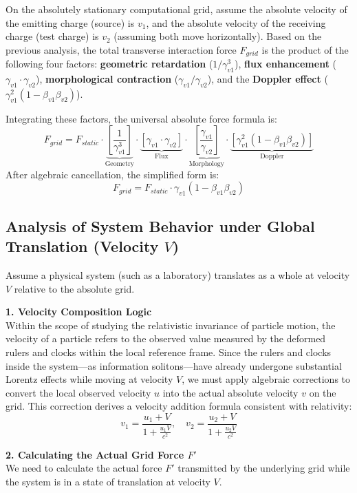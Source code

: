 \documentclass[12pt, a4paper]{article}
\begin{document}
On the absolutely stationary computational grid, assume the absolute velocity of the emitting charge (source) is $v_1$, and the absolute velocity of the receiving charge (test charge) is $v_2$ (assuming both move horizontally). Based on the previous analysis, the total transverse interaction force $F_{grid}$ is the product of the following four factors: \textbf{geometric retardation} ($1/\gamma_{v1}^3$), \textbf{flux enhancement} ($\gamma_{v1} \cdot \gamma_{v2}$), \textbf{morphological contraction} ($\gamma_{v1} / \gamma_{v2}$), and the \textbf{Doppler effect} ($\gamma_{v1}^2 (1 - \beta_{v1}\beta_{v2})$).

Integrating these factors, the universal absolute force formula is:
\[
F_{grid} = F_{static} \cdot \underbrace{\left[ \frac{1}{\gamma_{v1}^3} \right]}_{\text{Geometry}} \cdot \underbrace{\left[ \gamma_{v1} \cdot \gamma_{v2} \right]}_{\text{Flux}} \cdot \underbrace{\left[ \frac{\gamma_{v1}}{\gamma_{v2}} \right]}_{\text{Morphology}} \cdot \underbrace{\left[ \gamma_{v1}^2 (1 - \beta_{v1}\beta_{v2}) \right]}_{\text{Doppler}}
\]
After algebraic cancellation, the simplified form is:
\[
F_{grid} = F_{static} \cdot \gamma_{v1} (1 - \beta_{v1}\beta_{v2})
\]

\subsection{Analysis of System Behavior under Global Translation (Velocity $V$)}

Assume a physical system (such as a laboratory) translates as a whole at velocity $V$ relative to the absolute grid.

\textbf{1. Velocity Composition Logic} \\
Within the scope of studying the relativistic invariance of particle motion, the velocity of a particle refers to the observed value measured by the deformed rulers and clocks within the local reference frame. Since the rulers and clocks inside the system—as information solitons—have already undergone substantial Lorentz effects while moving at velocity $V$, we must apply algebraic corrections to convert the local observed velocity $u$ into the actual absolute velocity $v$ on the grid. This correction derives a velocity addition formula consistent with relativity:
\[
v_1 = \frac{u_1 + V}{1 + \frac{u_1V}{c^2}}, \quad v_2 = \frac{u_2 + V}{1 + \frac{u_2V}{c^2}}
\]

\textbf{2. Calculating the Actual Grid Force $F'$} \\
We need to calculate the actual force $F'$ transmitted by the underlying grid while the system is in a state of translation at velocity $V$.
\end{document}
